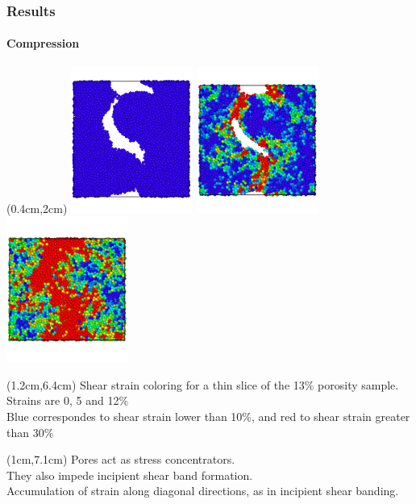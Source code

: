 \begin{frame}
    \frametitle{Results}
    \framesubtitle{Compression}
    \begin{textblock*}{6.5cm}(0.4cm,2cm) %
        \includegraphics[width=4cm]{Presentacion_PANACM_Franco/13_0strain.png}
        \includegraphics[width=4cm]{Presentacion_PANACM_Franco/13_5strain_comp.png}
        \includegraphics[width=4cm]{Presentacion_PANACM_Franco/13_12strain_comp.png}
    \end{textblock*}
    \begin{textblock*}{11cm}(1.2cm,6.4cm) %
        \centering
        \tiny{Shear strain coloring for a thin slice of the 13\% porosity sample. Strains are 0, 5 and 12\%\\Blue correspondes to shear strain lower than 10\%, and red to shear strain greater than 30\%}
    \end{textblock*}
    \begin{textblock*}{11cm}(1cm,7.1cm) %
        Pores act as stress concentrators.\\
        They also impede incipient shear band formation.\\
        Accumulation of strain along diagonal directions, as in incipient shear banding.
    \end{textblock*}
\end{frame}

